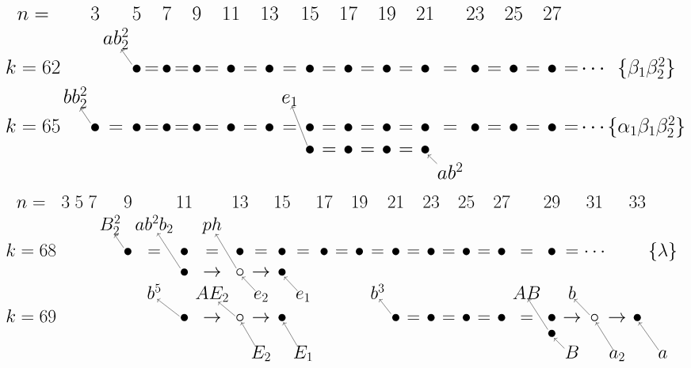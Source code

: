 \documentclass{article}
\begin{document}
\(
\begin{tikzcd}[
nodes={font=\huge,inner sep=0pt},
row sep=0.3cm,
column sep=0.1cm]
n= && 3 && 5 && 7 && 9 && 11 && 13 && 15 && 17 && 19 && 21 && 23 && 25 && 27 \\
 & && ab_2^2 && &&  \\
k=62 && && \bullet\arrow[lu] &=& \bullet &=& \bullet & = & \bullet & = & \bullet & = & \bullet & = & \bullet & = & \bullet  &=& \bullet &=& \bullet &=& \bullet &=& \bullet &=& \cdots & \{\beta_1\beta_2^2\} \\
& bb_2^2 && && && && && && e_1 \\
k=65 && \bullet \arrow[lu] &=& \bullet  &=& \bullet &=& \bullet &=& \bullet &=& \bullet &=& \bullet &=& \bullet &=& \bullet &=& \bullet &=& \bullet &=& \bullet &=& \bullet &=& \cdots & \{\alpha_1\beta_1\beta_2^2\} \\
&& && && && && && && \bullet\arrow[luu] &=& \bullet &=& \bullet &=& \bullet \\
& && && && && && && && && && && ab^2\arrow[lu] \\
\\
\end{tikzcd}
\) \\
\(
\begin{tikzcd}[
nodes={font=\huge,inner sep=0pt},
row sep=0.3cm,
column sep=0.1cm]
n= && 3 && 5 && 7 && 9 && 11 && 13 && 15 && 17 && 19 && 21 && 23 && 25 && 27 && 29 && 31 && 33\\
& && && && B_2^2 && ab^2b_2 && ph \\
k=68 && && && && \bullet \arrow[lu] &=& \bullet &=& \bullet &=& \bullet &=& \bullet &=& \bullet &=& \bullet &=& \bullet &=& \bullet &=& \bullet &=& \bullet &=& \cdots &&& \{\lambda\} \\
&& && && && && \bullet \arrow[luu] & \rightarrow & \circ\arrow[luu] & \rightarrow & \bullet \\
& && && && && b^5 && AE_2 && e_2\arrow[lu] && e_1\arrow[lu] && && b^3 && && && && AB && b \\
k=69 && && && && && \bullet \arrow[lu] & \rightarrow & \circ\arrow[lu] & \rightarrow & \bullet && && && \bullet\arrow[lu] &=& \bullet &=& \bullet &=& \bullet &=& \bullet & \rightarrow & \circ\arrow[lu] & \rightarrow & \bullet \\
&& && && && && && && && && && && && && && \bullet\arrow[luu] && && && &&  \\
& && && && && && && E_2\arrow[luu] && E_1\arrow[luu] && && && && && && && B\arrow[lu] && a_2\arrow[luu] && a\arrow[luu] 
\\
\end{tikzcd}
\)
\end{document}
